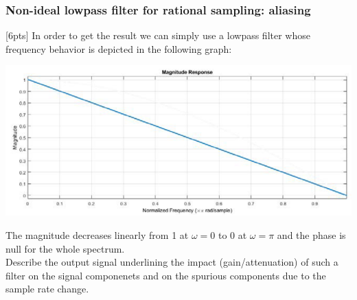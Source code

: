 
    \subsubsection{Non-ideal lowpass filter for rational sampling: aliasing}
    [6pts] In order to get the result we can simply use a lowpass filter whose frequency behavior is depicted in the following graph:
    \begin{center}
        \includegraphics[width=1\textwidth]{images/20211108_23.png}
    \end{center}
    The magnitude decreases linearly from 1 at $\omega=0$ to 0 at $\omega=\pi$ and the phase is null for the whole spectrum.\\
    Describe the output signal underlining the impact (gain/attenuation) of such a filter on the signal componenets and on the spurious components due to the sample rate change.


